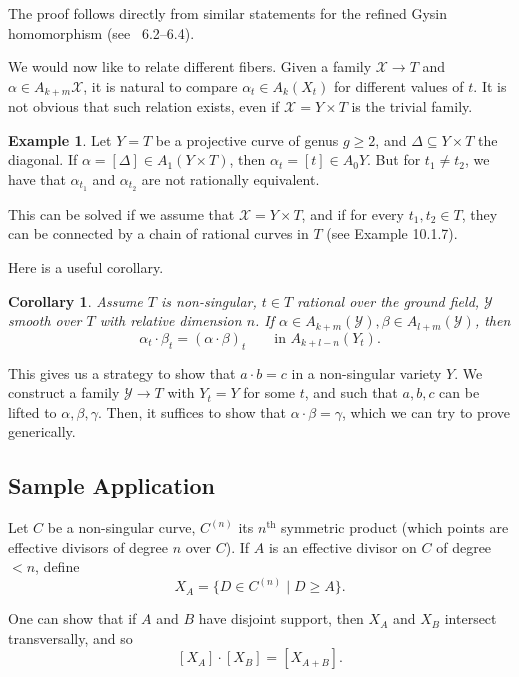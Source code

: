 \documentclass[leqno, openany]{memoir}
\newtheorem{cor}[thm]{Corollary}
\theoremstyle{definition}
\newtheorem{exm}[thm]{Example}
\theoremstyle{remark}
\theoremstyle{plain}
\theoremstyle{definition}
\theoremstyle{remark}
\newcommand{\msc}[1]{\mathscr{#1}}
\begin{document}
The proof follows directly from similar statements for the refined Gysin homomorphism (see \textsection~6.2--6.4).

We would now like to relate different fibers. Given a family $\msc{X} \to T$ and $\alpha \in A_{k+m}\msc{X}$, it is natural to compare $\alpha_t \in A_k(X_t)$ for different values of $t$. It is not obvious that such relation exists, even if $\msc{X}=Y \times T$ is the trivial family.

\begin{exm}
Let $Y=T$ be a projective curve of genus $g \geq 2$, and $\Delta\subseteq Y \times T$ the diagonal. If $\alpha = [\Delta] \in A_1(Y \times T)$, then $\alpha_t = [t] \in A_0 Y$. But for $t_1 \neq t_2$, we have that $\alpha_{t_1}$ and $\alpha_{t_2}$ are not rationally equivalent. 
\end{exm}

This can be solved if we assume that $\msc{X}=Y \times T$, and if for every $t_1, t_2 \in T$, they can be connected by a chain of rational curves in $T$ (see Example 10.1.7).

Here is a useful corollary.
\begin{cor}\label{cor:intfiber}
Assume $T$ is non-singular, $t \in T$ rational over the ground field, $\msc{Y}$ smooth over $T$ with relative dimension $n$. If $\alpha \in A_{k+m}(\msc{Y}), \beta \in A_{l+m}(\msc{Y})$, then 
\[ \alpha_t \cdot \beta_t = { (\alpha \cdot \beta) }_t \qquad \text{in } A_{k+l-n}(Y_t). \]
\end{cor}

This gives us a strategy to show that $a \cdot b=c$ in a non-singular variety $Y$. We construct a family $\msc{Y} \to T$ with $Y_t=Y$ for some $t$, and such that $a, b, c$ can be lifted to $\alpha, \beta, \gamma$. Then, it suffices to show that $\alpha \cdot \beta=\gamma$, which we can try to prove generically.

\subsection{Sample Application}%
\label{sub:sample_application}


Let $C$ be a non-singular curve, $C^{(n)}$ its $n^{\text{th}}$ symmetric product (which points are effective divisors of degree $n$ over $C$). If $A$ is an effective divisor on $C$ of degree $<n$, define
\[ X_A=\{D \in C^{(n)} \mid D \geq A \}. \]

One can show that if $A$ and $B$ have disjoint support, then $X_A$ and $X_B$ intersect transversally, and so
\[ [X_A] \cdot [X_B]=[X_{A+B}]. \]
\end{document}
